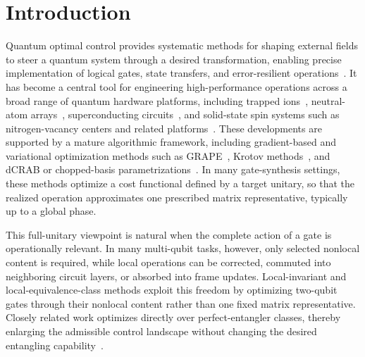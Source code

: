 \documentclass[
  aps,
  pra,
  reprint,            %
  superscriptaddress, %
  amsmath,amssymb,
  notitlepage
]{revtex4-2}
\begin{document}
\maketitle


\section*{Introduction}

Quantum optimal control provides systematic methods for shaping external fields to steer a quantum system through a desired transformation, enabling precise implementation of logical gates, state transfers, and error-resilient operations~\cite{koch2022quantum}. It has become a central tool for engineering high-performance operations across a broad range of quantum hardware platforms, including trapped ions~\cite{monz201114}, neutral-atom arrays~\cite{evered2023high,levine2019parallel,omran2019generation}, superconducting circuits~\cite{li2024hardware,zhao2025microwave,barnes2017fast,li2024experimental,gao2025ultrafast}, and solid-state spin systems such as nitrogen-vacancy centers and related platforms~\cite{dong2024time,ChouNVOptim,wang2025circuit}. These developments are supported by a mature algorithmic framework, including gradient-based and variational optimization methods such as GRAPE~\cite{khaneja2005optimal,de2011second,motzoi2011optimal,hogben2011spinach}, Krotov methods~\cite{konnov1999deterministic,Reich07062014,goerz2019krotov,reich2012monotonically,goerz2014optimal}, and dCRAB or chopped-basis parametrizations~\cite{caneva2011chopped,rach2015dressing,doria2011optimal,muellercontrol}. In many gate-synthesis settings, these methods optimize a cost functional defined by a target unitary, so that the realized operation approximates one prescribed matrix representative, typically up to a global phase.

\medskip
\noindent
This full-unitary viewpoint is natural when the complete action of a gate is operationally relevant. In many multi-qubit tasks, however, only selected nonlocal content is required, while local operations can be corrected, commuted into neighboring circuit layers, or absorbed into frame updates. Local-invariant and local-equivalence-class methods exploit this freedom by optimizing two-qubit gates through their nonlocal content rather than one fixed matrix representative. Closely related work optimizes directly over perfect-entangler classes, thereby enlarging the admissible control landscape without changing the desired entangling capability~\cite{zhang2003geometric,rezakhani2004characterization,muller2011optimizing,goerz2015optimizing,watts2015optimizing,frey2026optimal}.
\end{document}
